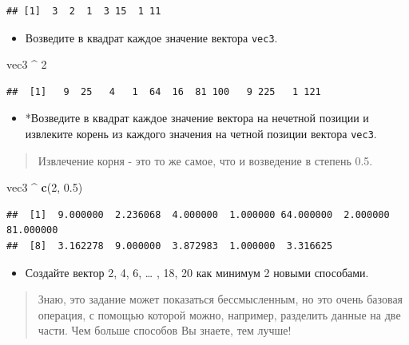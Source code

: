 \documentclass[]{book}
\newenvironment{Shaded}{\begin{snugshade}}{\end{snugshade}}
\newcommand{\KeywordTok}[1]{\textcolor[rgb]{0.13,0.29,0.53}{\textbf{#1}}}
\newcommand{\DecValTok}[1]{\textcolor[rgb]{0.00,0.00,0.81}{#1}}
\newcommand{\FloatTok}[1]{\textcolor[rgb]{0.00,0.00,0.81}{#1}}
\newcommand{\StringTok}[1]{\textcolor[rgb]{0.31,0.60,0.02}{#1}}
\newcommand{\OperatorTok}[1]{\textcolor[rgb]{0.81,0.36,0.00}{\textbf{#1}}}
\newcommand{\NormalTok}[1]{#1}
\providecommand{\tightlist}{%
  \setlength{\itemsep}{0pt}\setlength{\parskip}{0pt}}
\begin{document}
\begin{verbatim}
## [1]  3  2  1  3 15  1 11
\end{verbatim}

\begin{itemize}
\tightlist
\item
  Возведите в квадрат каждое значение вектора \texttt{vec3}.
\end{itemize}

\begin{Shaded}
\begin{Highlighting}[]
\NormalTok{vec3 }\OperatorTok{^}\StringTok{ }\DecValTok{2}
\end{Highlighting}
\end{Shaded}

\begin{verbatim}
##  [1]   9  25   4   1  64  16  81 100   9 225   1 121
\end{verbatim}

\begin{itemize}
\tightlist
\item
  *Возведите в квадрат каждое значение вектора на нечетной позиции и
  извлеките корень из каждого значения на четной позиции вектора
  \texttt{vec3}.
\end{itemize}

\begin{quote}
Извлечение корня - это то же самое, что и возведение в степень 0.5.
\end{quote}

\begin{Shaded}
\begin{Highlighting}[]
\NormalTok{vec3 }\OperatorTok{^}\StringTok{ }\KeywordTok{c}\NormalTok{(}\DecValTok{2}\NormalTok{, }\FloatTok{0.5}\NormalTok{)}
\end{Highlighting}
\end{Shaded}

\begin{verbatim}
##  [1]  9.000000  2.236068  4.000000  1.000000 64.000000  2.000000 81.000000
##  [8]  3.162278  9.000000  3.872983  1.000000  3.316625
\end{verbatim}

\begin{itemize}
\tightlist
\item
  Создайте вектор 2, 4, 6, \ldots{} , 18, 20 как минимум 2 новыми
  способами.
\end{itemize}

\begin{quote}
Знаю, это задание может показаться бессмысленным, но это очень базовая
операция, с помощью которой можно, например, разделить данные на две
части. Чем больше способов Вы знаете, тем лучше!
\end{quote}
\end{document}
